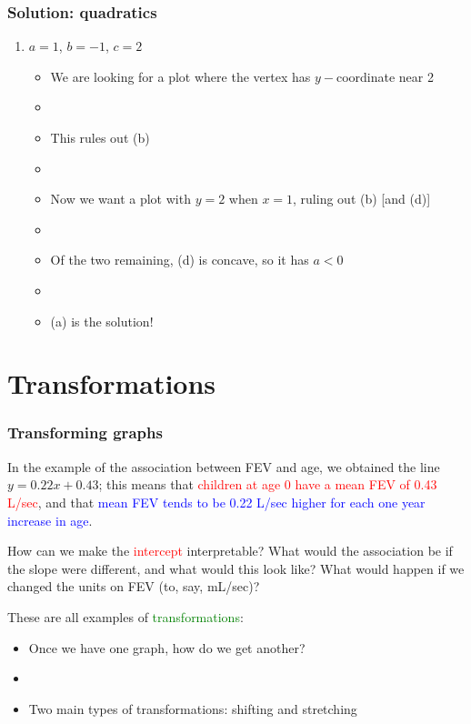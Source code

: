 \documentclass[11pt]{beamer}
\newcommand{\myframe}[1]{\begin{frame} \frametitle{#1}}
\begin{document}
\myframe{Solution: quadratics}
\begin{enumerate}
\item $a = 1$, $b = -1$, $c = 2$
\begin{itemize}
\item We are looking for a plot where the vertex has $y-$coordinate near 2
\item[]
\item This rules out (b)
\item[]
\item Now we want a plot with $y = 2$ when $x = 1$, ruling out (b) [and (d)]
\item[]
\item Of the two remaining, (d) is concave, so it has $a < 0$
\item[]
\item (a) is the solution!
\end{itemize}
\end{enumerate}
\end{frame}

\section{Transformations}
\myframe{Transforming graphs}
In the example of the association between FEV and age, we obtained the line $y = 0.22x + 0.43$; this means that \textcolor{red}{children at age 0 have a mean FEV of 0.43 L/sec}, and that \textcolor{blue}{mean FEV tends to be 0.22 L/sec higher for each one year increase in age}.

How can we make the \textcolor{red}{intercept} interpretable? What would the association be if the slope were different, and what would this look like? What would happen if we changed the units on FEV (to, say, mL/sec)? 

These are all examples of \textcolor{green}{transformations}:
\begin{itemize}
\item Once we have one graph, how do we get another?
\item[]
\item Two main types of transformations: shifting and stretching
\end{itemize}
\end{frame}
\end{document}
